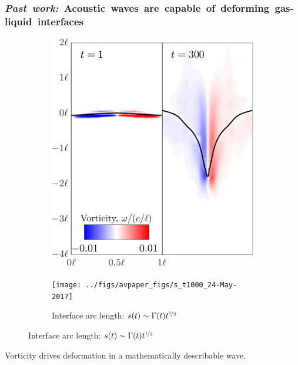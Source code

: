 \begin{frame} \frametitle{\mbox{\textit{Past work:} Acoustic waves are capable of deforming gas-liquid interfaces}}
  \begin{figure}
    \centering
    \captionsetup[subfigure]{labelformat=empty}
    \begin{subfigure}[b]{0.45\textwidth}
      \includegraphics[width=\textwidth]{./figs/vorticity_snapshots_asa}
    \end{subfigure}
    \begin{subfigure}[b]{0.45\textwidth}
      \texttt{[image: ../figs/avpaper\_figs/s\_t1000\_24-May-2017]}
      \caption{\label{fig:trapz_scp_t1000_unscaled} Interface arc length: $s(t) \sim \Gamma(t) t^{\nicefrac{1}{2}}$}
    \end{subfigure}
  \end{figure}
  Vorticity drives deformation in a mathematically describable wave.
\end{frame}

